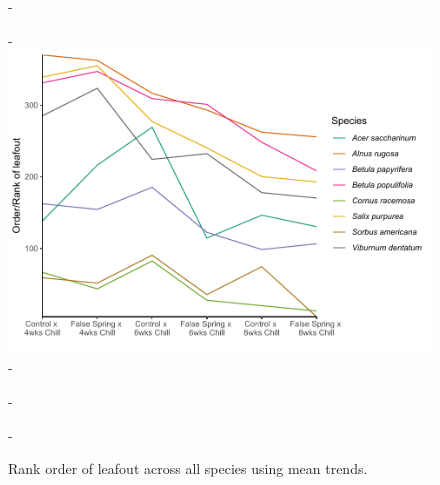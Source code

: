 \documentclass{article}\usepackage[]{graphicx}\usepackage[]{color}
\begin{document}
{\begin{figure} [H]
  -\begin{center}
  -\includegraphics[width=12cm]{..//analyses/figures/budsetorder_byrank.pdf} 
  -\caption{Rank order of leafout across all species using mean trends. }\label{fig:bsetrank}
  -\end{center}
  -\end{figure}}


\end{document}
